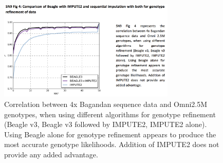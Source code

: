 \begin{figure}[htbp]
\centering
\includegraphics[trim={0 0cm 10cm 2cm},clip,width=0.75\textwidth]{fig/SN09f4}
\caption[Evaluation of refinement strategies.]{Correlation between 4x Bagandan sequence data and Omni2.5M genotypes, when using different algorithms for genotype refinement (Beagle v3\cite{Browning20071084}, Beagle v3 followed by IMPUTE2\cite{10.1371/journal.pgen.1000529}, IMPUTE2 alone). Using Beagle alone for genotype refinement appears to produce the most accurate genotype likelihoods. Addition of IMPUTE2 does not provide any added advantage.}
\label{fig:SN09f4}
\end{figure}
